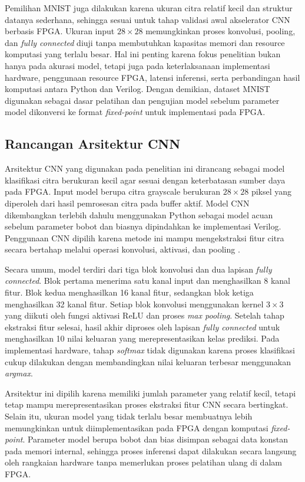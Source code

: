 		Pemilihan MNIST juga dilakukan karena ukuran citra relatif kecil dan struktur
		datanya sederhana, sehingga sesuai untuk tahap validasi awal akselerator CNN
		berbasis FPGA. Ukuran input $28 \times 28$ memungkinkan proses konvolusi,
		pooling, dan \emph{fully connected} diuji tanpa membutuhkan kapasitas memori
		dan resource komputasi yang terlalu besar. Hal ini penting karena fokus
		penelitian bukan hanya pada akurasi model, tetapi juga pada keterlaksanaan
		implementasi hardware, penggunaan resource FPGA, latensi inferensi, serta
		perbandingan hasil komputasi antara Python dan Verilog. Dengan demikian,
		dataset MNIST digunakan sebagai dasar pelatihan dan pengujian model sebelum
		parameter model dikonversi ke format \emph{fixed-point} untuk implementasi
		pada FPGA.

    \subsection{Rancangan Arsitektur CNN}
	Arsitektur CNN yang digunakan pada penelitian ini
	dirancang sebagai model klasifikasi citra berukuran
	kecil agar sesuai dengan keterbatasan sumber daya
	pada FPGA. Input model berupa citra grayscale
	berukuran $28 \times 28$ piksel yang diperoleh dari
	hasil pemrosesan citra pada buffer aktif. Model CNN dikembangkan
	terlebih dahulu menggunakan Python sebagai model
	acuan sebelum parameter bobot dan biasnya dipindahkan
	ke implementasi Verilog. Penggunaan CNN dipilih
	karena metode ini mampu mengekstraksi fitur citra
	secara bertahap melalui operasi konvolusi, aktivasi,
	dan pooling \cite{Goodfellow2016DeepLearning, Lecun1998GradientBasedLearning}.

	Secara umum, model terdiri dari tiga blok konvolusi
	dan dua lapisan \emph{fully connected}. Blok pertama
	menerima satu kanal input dan menghasilkan 8 kanal
	fitur. Blok kedua menghasilkan 16 kanal fitur,
	sedangkan blok ketiga menghasilkan 32 kanal fitur.
	Setiap blok konvolusi menggunakan kernel $3 \times 3$
	yang diikuti oleh fungsi aktivasi ReLU dan proses
	\emph{max pooling}. Setelah tahap ekstraksi fitur
	selesai, hasil akhir diproses oleh lapisan
	\emph{fully connected} untuk menghasilkan 10 nilai
	keluaran yang merepresentasikan kelas prediksi.
	Pada implementasi hardware, tahap \emph{softmax}
	tidak digunakan karena proses klasifikasi cukup
	dilakukan dengan membandingkan nilai keluaran
	terbesar menggunakan \emph{argmax}.

	Arsitektur ini dipilih karena memiliki jumlah
	parameter yang relatif kecil, tetapi tetap mampu
	merepresentasikan proses ekstraksi fitur CNN secara
	bertingkat. Selain itu, ukuran model yang tidak
	terlalu besar membuatnya lebih memungkinkan untuk
	diimplementasikan pada FPGA dengan komputasi
	\emph{fixed-point}. Parameter model berupa bobot
	dan bias disimpan sebagai data konstan pada memori
	internal, sehingga proses inferensi dapat dilakukan
	secara langsung oleh rangkaian hardware tanpa
	memerlukan proses pelatihan ulang di dalam FPGA.

